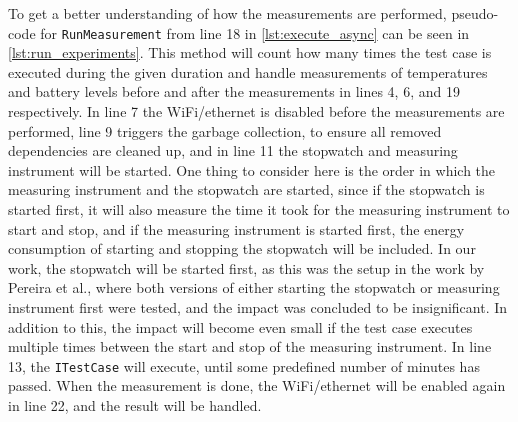 To get a better understanding of how the measurements are performed, pseudo-code for \texttt{RunMeasurement} from line 18 in \cref{lst:execute_async} can be seen in \cref{lst:run_experiments}. This method will count how many times the test case is executed during the given duration and handle measurements of temperatures and battery levels before and after the measurements in lines 4, 6, and 19 respectively. In line 7 the WiFi/ethernet is disabled before the measurements are performed, line 9 triggers the garbage collection, to ensure all removed dependencies are cleaned up, and in line 11 the stopwatch and measuring instrument will be started. One thing to consider here is the order in which the measuring instrument and the stopwatch are started, since if the stopwatch is started first, it will also measure the time it took for the measuring instrument to start and stop, and if the measuring instrument is started first, the energy consumption of starting and stopping the stopwatch will be included. In our work, the stopwatch will be started first, as this was the setup in the work by Pereira et al.\cite[]{Pereira2017}, where both versions of either starting the stopwatch or measuring instrument first were tested, and the impact was concluded to be insignificant. In addition to this, the impact will become even small if the test case executes multiple times between the start and stop of the measuring instrument. In line 13, the \texttt{ITestCase} will execute, until some predefined number of minutes has passed. When the measurement is done, the WiFi/ethernet will be enabled again in line 22, and the result will be handled.\newpage





